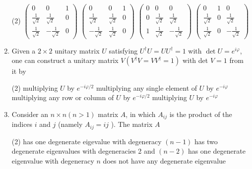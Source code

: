 \begin{enumerate}
	 \begin{tasks}(2)
		\task[\textbf{a.}]$\left(\begin{array}{ccc}0 & 0 & 1 \\ \frac{1}{\sqrt{2}} & \frac{1}{\sqrt{2}} & 0 \\ \frac{1}{\sqrt{2}} & -\frac{1}{\sqrt{2}} & 0\end{array}\right)$
		\task[\textbf{b.}]$\left(\begin{array}{ccc}0 & 0 & 1 \\ \frac{1}{\sqrt{2}} & \frac{1}{\sqrt{2}} & 0 \\ -\frac{1}{\sqrt{2}} & \frac{1}{\sqrt{2}} & 0\end{array}\right)$
		\task[\textbf{c.}] $\left(\begin{array}{ccc}0 & 0 & 0 \\ 0 & \frac{1}{\sqrt{2}} & \frac{1}{\sqrt{2}} \\ 1 & \frac{1}{\sqrt{2}} & -\frac{1}{\sqrt{2}}\end{array}\right)$
		\task[\textbf{d.}]  $\left(\begin{array}{ccc}0 & 1 & 0 \\ \frac{1}{\sqrt{2}} & 0 & \frac{1}{\sqrt{2}} \\ \frac{1}{\sqrt{2}} & 0 & -\frac{1}{\sqrt{2}}\end{array}\right)$
	\end{tasks}
	\item Given a $2 \times 2$ unitary matrix $U$ satisfying $U^{\dagger} U=U U^{\dagger}=1$ with $\operatorname{det} U=e^{i \varphi}$, one can construct a unitary matrix $V\left(V^{\dagger} V=V V^{\dagger}=1\right)$ with det $V=1$ from it by
	 \begin{tasks}(2)
		\task[\textbf{a.}] multiplying $U$ by $e^{-i \varphi / 2}$
		\task[\textbf{b.}] multiplying any single element of $U$ by $e^{-i \varphi}$
		\task[\textbf{c.}] multiplying any row or column of $U$ by $e^{-i \varphi / 2}$
		\task[\textbf{d.}]  multiplying $U$ by $e^{-i \varphi}$
	\end{tasks}
	\item Consider an $n \times n(n>1)$ matrix $A$, in which $A_{i j}$ is the product of the indices $i$ and $j$ (namely $A_{i j}=i j$ ). The matrix $A$
	 \begin{tasks}(2)
		\task[\textbf{a.}]has one degenerate eigevalue with degeneracy $(n-1)$
		\task[\textbf{b.}]has two degenerate eigenvalues with degeneracies 2 and $(n-2)$
		\task[\textbf{c.}]has one degenerate eigenvalue with degeneracy $n$
		\task[\textbf{d.}] does not have any degenerate eigenvalue

\end{tasks}
\end{enumerate}
